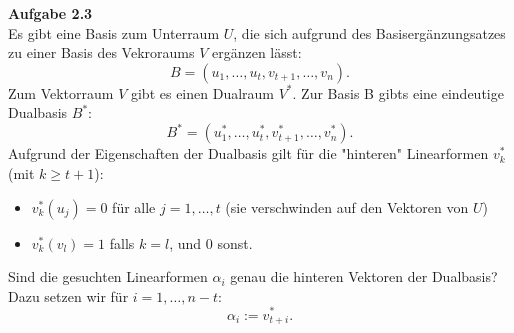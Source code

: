 \documentclass[a4paper,12pt]{article}
\begin{document}
\raggedright
\doublespacing
\noindent\textbf{Aufgabe 2.3} \\

Es gibt eine Basis zum Unterraum $U$, die sich aufgrund des Basisergänzungsatzes zu einer Basis des Vekroraums $V$ ergänzen lässt:
$$B = (u_1, \ldots , u_t, v_{t+1}, \ldots, v_{n}).$$
Zum Vektorraum $V$ gibt es einen Dualraum $V^*$. Zur Basis B gibts eine eindeutige Dualbasis $B^*$:
$$B^* = (u_1^*, \ldots , u_t^*, v_{t+1}^*, \ldots, v_{n}^*).$$
Aufgrund der Eigenschaften der Dualbasis gilt für die "hinteren" Linearformen $v_k^*$ (mit $k \ge t+1$):\\
\begin{itemize}
  \item $v_k^*(u_j) = 0$ für alle $j = 1, \ldots, t$ (sie verschwinden auf den Vektoren von $U$)
  \item $v_k^*(v_l) = 1$ falls $k=l$, und $0$ sonst.
\end{itemize}
Sind die gesuchten Linearformen $\alpha_i$ genau die hinteren Vektoren der Dualbasis? \\
Dazu setzen wir für $i = 1, \ldots, n-t$:
$$\alpha_i := v_{t+i}^*.$$
\end{document}
